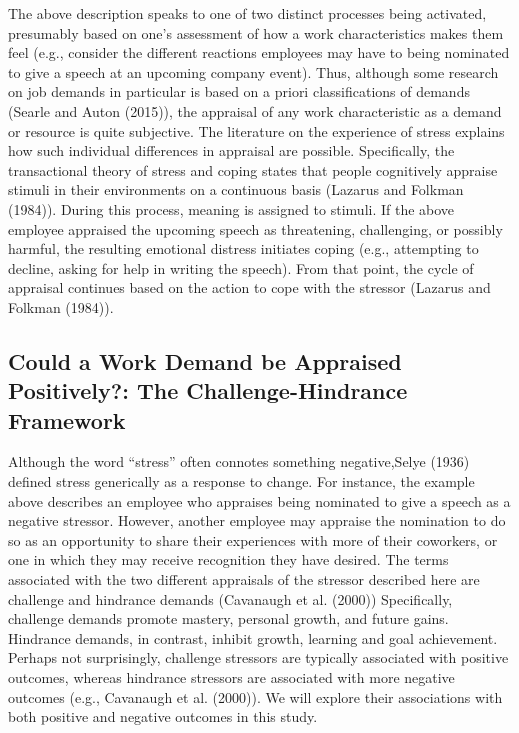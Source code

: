 \documentclass[
  man]{apa6}
\begin{document}
The above description speaks to one of two distinct processes being activated, presumably based on one's assessment of how a work characteristics makes them feel (e.g., consider the different reactions employees may have to being nominated to give a speech at an upcoming company event). Thus, although some research on job demands in particular is based on a priori classifications of demands (Searle and Auton (2015)), the appraisal of any work characteristic as a demand or resource is quite subjective. The literature on the experience of stress explains how such individual differences in appraisal are possible. Specifically, the transactional theory of stress and coping states that people cognitively appraise stimuli in their environments on a continuous basis (Lazarus and Folkman (1984)). During this process, meaning is assigned to stimuli. If the above employee appraised the upcoming speech as threatening, challenging, or possibly harmful, the resulting emotional distress initiates coping (e.g., attempting to decline, asking for help in writing the speech). From that point, the cycle of appraisal continues based on the action to cope with the stressor (Lazarus and Folkman (1984)).

\hypertarget{could-a-work-demand-be-appraised-positively-the-challenge-hindrance-framework}{%
\subsection{Could a Work Demand be Appraised Positively?: The Challenge-Hindrance Framework}\label{could-a-work-demand-be-appraised-positively-the-challenge-hindrance-framework}}

Although the word ``stress'' often connotes something negative,Selye (1936) defined stress generically as a response to change. For instance, the example above describes an employee who appraises being nominated to give a speech as a negative stressor. However, another employee may appraise the nomination to do so as an opportunity to share their experiences with more of their coworkers, or one in which they may receive recognition they have desired. The terms associated with the two different appraisals of the stressor described here are challenge and hindrance demands (Cavanaugh et al. (2000)) Specifically, challenge demands promote mastery, personal growth, and future gains. Hindrance demands, in contrast, inhibit growth, learning and goal achievement. Perhaps not surprisingly, challenge stressors are typically associated with positive outcomes, whereas hindrance stressors are associated with more negative outcomes (e.g., Cavanaugh et al. (2000)). We will explore their associations with both positive and negative outcomes in this study.
\end{document}
